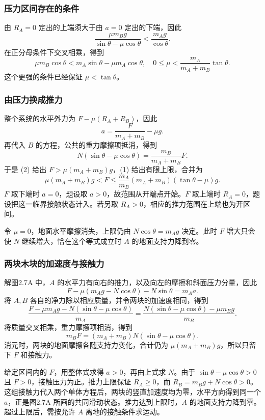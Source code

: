 \documentclass[UTF8,fontset=fandol,a4paper,11pt]{ctexart}
\begin{document}
\subsubsection*{压力区间存在的条件}
由 $R_A=0$ 定出的上端须大于由 $a=0$ 定出的下端，因此
\[
\frac{\mu m_Bg}{\sin\theta-\mu\cos\theta}
<\frac{m_Ag}{\cos\theta}.
\]
在正分母条件下交叉相乘，得到
\[
\mu m_B\cos\theta<m_A\sin\theta-\mu m_A\cos\theta,
\quad\boxed{0\leq\mu<\frac{m_A}{m_A+m_B}\tan\theta}.
\]
这个更强的条件已经保证 $\mu<\tan\theta$。

\subsubsection*{由压力换成推力}
整个系统的水平外力为 $F-\mu(R_A+R_B)$，因此
\[
a=\frac{F}{m_A+m_B}-\mu g.
\]
再代入 $B$ 的方程，公共的重力摩擦项抵消，得到
\[
N(\sin\theta-\mu\cos\theta)
=\frac{m_B}{m_A+m_B}F.
\]
于是 (2) 给出 $F>\mu(m_A+m_B)g$，(1) 给出有限上限，合并为
\[
\boxed{\mu(m_A+m_B)g<F
\leq\frac{m_A}{m_B}(m_A+m_B)(\tan\theta-\mu)g}.
\]
$F$ 取下端时 $a=0$，题设取 $a>0$，故范围从开端点开始。$F$ 取上端时 $R_A=0$，题设把这一临界接触状态计入。若另取 $R_A>0$，相应的推力范围在上端也为开区间。

令 $\mu=0$，地面水平摩擦消失，上限仍由 $N\cos\theta=m_Ag$ 决定。此时 $F$ 增大只会使 $N$ 继续增大，恰在这个等式成立时 $A$ 的地面支持力降到零。
\subsubsection*{两块木块的加速度与接触力}
解图2.7A 中，$A$ 的水平力有向右的推力，以及向左的摩擦和斜面压力分量，因此
\[
F-\mu(m_Ag-N\cos\theta)-N\sin\theta=m_Aa.
\]
将 $A,B$ 各自的净力除以相应质量，并令两块的加速度相同，得到
\[
\frac{F-\mu m_Ag-N(\sin\theta-\mu\cos\theta)}{m_A}
=\frac{N(\sin\theta-\mu\cos\theta)-\mu m_Bg}{m_B}.
\]
将质量交叉相乘，重力摩擦项相消，得到
\[
m_BF=(m_A+m_B)N(\sin\theta-\mu\cos\theta).
\]
消元时，两块的地面摩擦各随支持力变化，合计仍为 $\mu(m_A+m_B)g$，所以只留下 $F$ 和接触力。

给定区间内的 $F$，用整体式求得 $a>0$，再由上式求 $N$。由于 $\sin\theta-\mu\cos\theta>0$ 且 $F>0$，接触压力为正。推力上限保证 $R_A\geq0$，而 $R_B=m_Bg+N\cos\theta>0$。这组接触力代入两个单体方程后，两块的竖直加速度均为零，水平方向得到同一个 $a$，正是图2.7A 所画的共同滑动状态。推力达到上限时，$A$ 的地面支持力降到零。超过上限后，需按允许 $A$ 离地的接触条件求运动。



\end{document}

